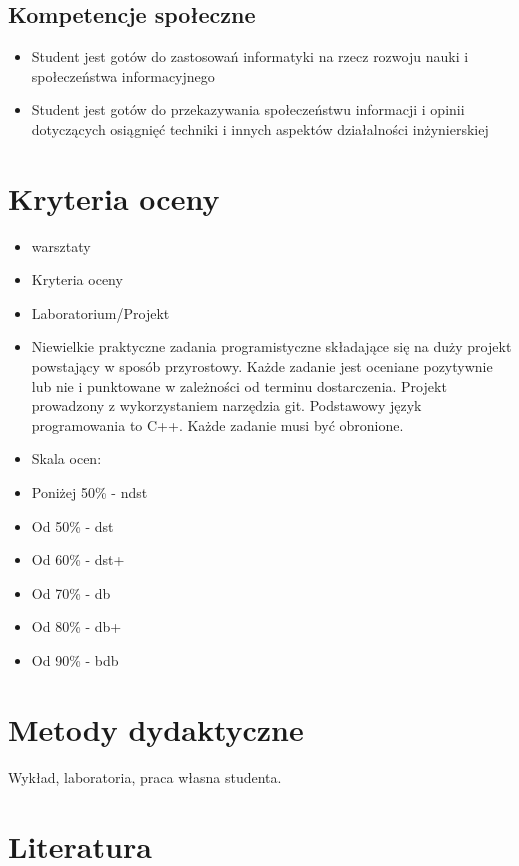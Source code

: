 \documentclass[12pt, a4paper]{article}
\begin{document}
\subsection*{Kompetencje społeczne}
\begin{itemize}
  \item Student jest gotów do zastosowań informatyki na rzecz rozwoju nauki i społeczeństwa informacyjnego
  \item Student jest gotów do przekazywania społeczeństwu informacji i opinii dotyczących osiągnięć techniki i innych aspektów działalności inżynierskiej
\end{itemize}

\section{Kryteria oceny}

\begin{itemize}
  \item warsztaty
  \item Kryteria oceny
  \item Laboratorium/Projekt
  \item Niewielkie praktyczne zadania programistyczne składające się na duży projekt powstający w sposób przyrostowy. Każde zadanie jest oceniane pozytywnie lub nie i  punktowane w zależności od terminu dostarczenia. Projekt prowadzony z wykorzystaniem narzędzia git. Podstawowy język programowania to C++. Każde zadanie musi być obronione.
  \item Skala ocen:
  \item Poniżej 50\% - ndst
  \item Od 50\% - dst
  \item Od 60\% - dst+
  \item Od 70\% - db
  \item Od 80\% - db+
  \item Od 90\% - bdb
\end{itemize}

\section{Metody dydaktyczne}

Wykład, laboratoria, praca własna studenta.

\section{Literatura}
\end{document}

